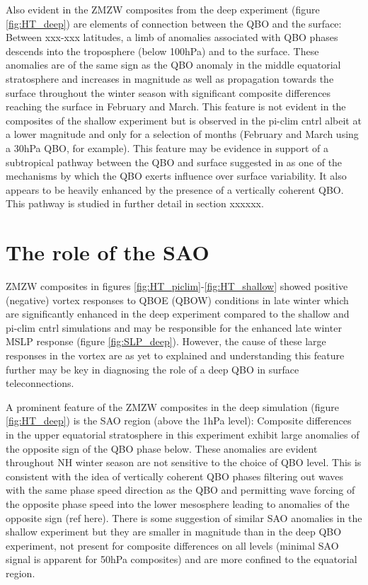 Also evident in the ZMZW composites from the deep experiment (figure \ref{fig:HT_deep}) are elements of connection between the QBO and the surface: Between xxx-xxx latitudes, a limb of anomalies associated with QBO phases descends into the troposphere (below 100hPa) and to the surface. These anomalies are of the same sign as the QBO anomaly in the middle equatorial stratosphere and increases in magnitude as well as propagation towards the surface throughout the winter season with significant composite differences reaching the surface in February and March. This feature is not evident in the composites of the shallow experiment but is observed in the pi-clim cntrl albeit at a lower magnitude and only for a selection of months (February and March using a 30hPa QBO, for example). This feature may be evidence in support of a subtropical pathway between the QBO and surface suggested in \cite{graySurface2018b} as one of the mechanisms by which the QBO exerts influence over surface variability. It also appears to be heavily enhanced by the presence of a vertically coherent QBO. This pathway is studied in further detail in section xxxxxx. 

\section{The role of the SAO}
ZMZW composites in figures \ref{fig:HT_piclim}-\ref{fig:HT_shallow} showed positive (negative) vortex responses to QBOE (QBOW) conditions in late winter which are significantly enhanced in the deep experiment compared to the shallow and pi-clim cntrl simulations and may be responsible for the enhanced late winter MSLP response (figure \ref{fig:SLP_deep}). However, the cause of these large responses in the vortex are as yet to explained and understanding this feature further may be key in diagnosing the role of a deep QBO in surface teleconnections.

A prominent feature of the ZMZW composites in the deep simulation (figure \ref{fig:HT_deep}) is the SAO region (above the 1hPa level): Composite differences in the upper equatorial stratosphere in this experiment exhibit large anomalies of the opposite sign of the QBO phase below. These anomalies are evident throughout NH winter season are not sensitive to the choice of QBO level. This is consistent with the idea of vertically coherent QBO phases filtering out waves with the same phase speed direction as the QBO and permitting wave forcing of the opposite phase speed into the lower mesosphere leading to anomalies of the opposite sign (ref here). There is some suggestion of similar SAO anomalies in the shallow experiment but they are smaller in magnitude than in the deep QBO experiment, not present for composite differences on all levels (minimal SAO signal is apparent for 50hPa composites) and are more confined to the equatorial region.

